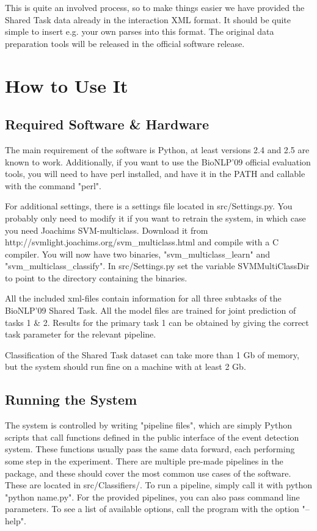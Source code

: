 \documentclass[a4paper,12pt]{article}
\begin{document}
This is quite an involved process, so to make things easier we have provided the Shared Task data already in the interaction XML format. It should be quite simple to insert e.g. your own parses into this format. The original data preparation tools will be released in the official software release.

\section{How to Use It}

\subsection{Required Software \& Hardware}

The main requirement of the software is Python, at least versions 2.4 and 2.5 are known to work. Additionally, if you want to use the BioNLP'09 official evaluation tools, you will need to have perl installed, and have it in the PATH and callable with the command "perl".

For additional settings, there is a settings file located in src/Settings.py. You probably only need to modify it if you want to retrain the system, in which case you need Joachims SVM-multiclass. Download it from http://svmlight.joachims.org/svm\_multiclass.html and compile with a C compiler. You will now have two binaries, "svm\_multiclass\_learn" and "svm\_multiclass\_classify". In src/Settings.py set the variable SVMMultiClassDir to point to the directory containing the binaries.

All the included xml-files contain information for all three subtasks of the BioNLP'09 Shared Task. All the model files are trained for joint prediction of tasks 1 \& 2. Results for the primary task 1 can be obtained by giving the correct task parameter for the relevant pipeline.

Classification of the Shared Task dataset can take more than 1 Gb of memory, but the system should run fine on a machine with at least 2 Gb.

\subsection{Running the System}

The system is controlled by writing "pipeline files", which are simply Python scripts that call functions defined in the public interface of the event detection system. These functions usually pass the same data forward, each performing some step in the experiment. There are multiple pre-made pipelines in the package, and these should cover the most common use cases of the software. These are located in src/Classifiers/. To run a pipeline, simply call it with python "python name.py". For the provided pipelines, you can also pass command line parameters. To see a list of available options, call the program with the option "--help".
\end{document}
